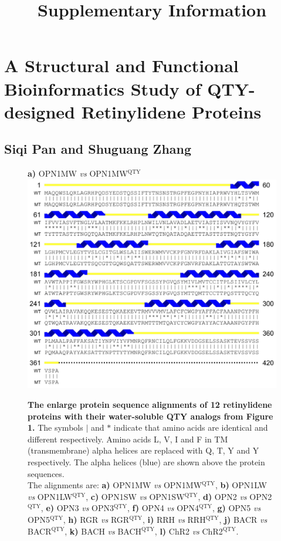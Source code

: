 \documentclass[fleqn,12pt]{supp}
\title{Supplementary Information}
\author{}
\begin{document}
\flushbottom
\maketitle

\vspace{-35pt}
\section*{A Structural and Functional Bioinformatics Study of QTY-designed Retinylidene Proteins}

\subsection*{Siqi Pan and Shuguang Zhang}

\begin{figure}[H]
    \label{tb:sequence}
    \caption{\textbf{The enlarge protein sequence alignments of 12 retinylidene proteins with their water-soluble QTY analogs from Figure 1.} The symbols $|$ and $*$ indicate that amino acids are identical and different respectively. Amino acids L, V, I and F in TM (transmembrane) alpha helices are replaced with Q, T, Y and Y respectively. The alpha helices (blue) are shown above the protein sequences. \\
    The alignments are: 
    \textbf{a)} OPN1MW \textit{vs} OPN1MW$^{\textrm{QTY}}$, 
    \textbf{b)} OPN1LW \textit{vs} OPN1LW$^{\textrm{QTY}}$, 
    \textbf{c)} OPN1SW \textit{vs} OPN1SW$^{\textrm{QTY}}$, 
    \textbf{d)} OPN2 \textit{vs} OPN2$^{\textrm{QTY}}$, 
    \textbf{e)} OPN3 \textit{vs} OPN3$^{\textrm{QTY}}$, 
    \textbf{f)} OPN4 \textit{vs} OPN4$^{\textrm{QTY}}$, 
    \textbf{g)} OPN5 \textit{vs} OPN5$^{\textrm{QTY}}$, 
    \textbf{h)} RGR \textit{vs} RGR$^{\textrm{QTY}}$, 
    \textbf{i)} RRH \textit{vs} RRH$^{\textrm{QTY}}$, 
    \textbf{j)} BACR \textit{vs} BACR$^{\textrm{QTY}}$, 
    \textbf{k)} BACH \textit{vs} BACH$^{\textrm{QTY}}$, 
    \textbf{l)} ChR2 \textit{vs} ChR2$^{\textrm{QTY}}$. }
    \textbf{a)} OPN1MW \textit{vs} OPN1MW$^{\textrm{QTY}}$ \\
    \includegraphics[width=\linewidth]{SuppFigures/opn1mw.jpg}
\end{figure}
\end{document}

